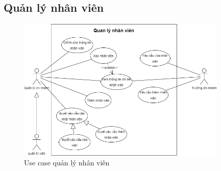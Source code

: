 \subsection{Quản lý nhân viên}
\begin{figure}[!htp]
    \begin{center}
        \includegraphics[width=10cm]{img/UseCase/UseCase-Quản lý nhân viên.drawio.png}
    \end{center}
    \caption{Use case quản lý nhân viên}
\end{figure}



